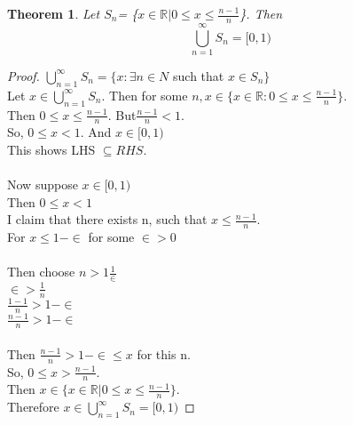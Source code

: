 \documentclass{article}
\newtheorem{theorem}{Theorem}
\begin{document}
\begin{theorem}
  Let $S_n$= \{$x \in \mathbb{R} | 0 \leq x \leq \frac{n-1}{n}$\}. Then
  \begin{displaymath}
    \bigcup_{n=1}^{\infty}{S_n} = [0,1)
  \end{displaymath}
\end{theorem}
\begin{proof}
  $\bigcup_{n=1}^{\infty}{S_n} = \{x: \exists n \in N$ such that $x \in S_{n}\}$ \\
  Let $x\in \bigcup_{n=1}^{\infty}{S_n}$. Then for some $n, x \in \{ x \in \mathbb{R}: 0 \leq x \leq \frac{n-1}{n}\}$.\\
  Then $0 \leq x \leq \frac{n-1}{n}$. But$\frac{n-1}{n} < 1 $. \\
  So, $0 \leq x < 1$. And $x \in [0,1)$\\
  This shows LHS $\subseteq RHS$.\\ \\
  Now suppose $x \in [ 0,1 )$\\
  Then $0 \leq x< 1$\\
  I claim that there exists n, such that $x \leq \frac{n-1}{n}$.\\
  For $x \leq 1 - \in$ for some $\in >0$\\ \\
  Then choose $n > 1 \frac{1}{\in}$\\
  $\in > \frac{1}{n}$\\
  $\frac{1-1}{n}>1-\in$\\
  $\frac{n-1}{n}> 1-\in$\\ \\
  Then $\frac{n-1}{n}>1-\in \leq x$ for this n.\\
  So, $0\leq x > \frac{n-1}{n}$.\\
  Then $x \in \{ x \in\mathbb{R} | 0 \leq x \leq \frac{n-1}{n}\}$.\\ 
  Therefore $x\in \bigcup_{n=1}^{\infty}{S_n} = [0,1)$
\end{proof}




\newpage
\end{document}

